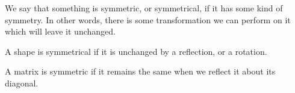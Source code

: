 We say that something is symmetric, or symmetrical, if it has some kind of 
symmetry. In other words, there is some transformation we can perform on it 
which will leave it unchanged.
\par
A shape is symmetrical if it is unchanged by a reflection, or a rotation.
\par
A matrix is symmetric if it remains the same when we reflect it about its diagonal.